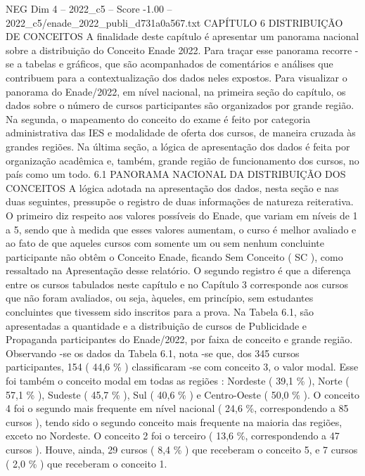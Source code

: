 \begin{textsample}{NEG Dim 4 – 2022\_c5 – Score -1.00 – 2022\_c5/enade\_2022\_publi\_d731a0a567.txt}  \label{ex:f4_neg_074}
CAPÍTULO 6 DISTRIBUIÇÃO DE CONCEITOS A finalidade deste capítulo é apresentar um panorama nacional sobre a distribuição do Conceito Enade 2022.
Para traçar esse panorama recorre -se a tabelas e gráficos, que são acompanhados de comentários e análises que contribuem para a contextualização dos dados neles expostos.
Para visualizar o panorama do Enade/2022, em nível nacional, na primeira seção do capítulo, os dados sobre o número de cursos participantes são organizados por grande região.
Na segunda, o mapeamento do conceito do exame é feito por categoria administrativa das IES e modalidade de oferta dos cursos, de maneira cruzada às grandes regiões.
Na última seção, a lógica de apresentação dos dados é feita por organização acadêmica e, também, grande região de funcionamento dos cursos, no país como um todo. 6.1 PANORAMA NACIONAL DA DISTRIBUIÇÃO DOS CONCEITOS A lógica adotada na apresentação dos dados, nesta seção e nas duas seguintes, pressupõe o registro de duas informações de natureza reiterativa.
O primeiro diz respeito aos valores possíveis do Enade, que variam em níveis de 1 a 5, sendo que à medida que esses valores aumentam, o curso é melhor avaliado e ao fato de que aqueles cursos com somente um ou sem nenhum concluinte participante não obtêm o Conceito Enade, ficando Sem Conceito ( SC ), como ressaltado na Apresentação desse relatório.
O segundo registro é que a diferença entre os cursos tabulados neste capítulo e no Capítulo 3 corresponde aos cursos que não foram avaliados, ou seja, àqueles, em princípio, sem estudantes concluintes que tivessem sido inscritos para a prova.
Na Tabela 6.1, são apresentadas a quantidade e a distribuição de cursos de Publicidade e Propaganda participantes do Enade/2022, por faixa de conceito e grande região.
Observando -se os dados da Tabela 6.1, nota -se que, dos 345 cursos participantes, 154 ( 44,6 \% ) classificaram -se com conceito 3, o valor modal.
Esse foi também o conceito modal em todas as regiões : Nordeste ( 39,1 \% ), Norte ( 57,1 \% ), Sudeste ( 45,7 \% ), Sul ( 40,6 \% ) e Centro-Oeste ( 50,0 \% ).
O conceito 4 foi o segundo mais frequente em nível nacional ( 24,6 \%, correspondendo a 85 cursos ), tendo sido o segundo conceito mais frequente na maioria das regiões, exceto no Nordeste.
O conceito 2 foi o terceiro ( 13,6 \%, correspondendo a 47 cursos ).
Houve, ainda, 29 cursos ( 8,4 \% ) que receberam o conceito 5, e 7 cursos ( 2,0 \% ) que receberam o conceito 1.

\end{textsample}
